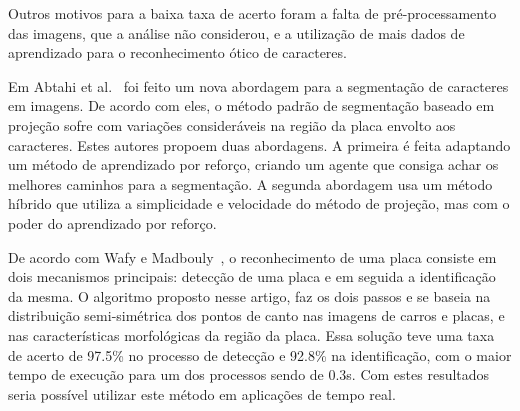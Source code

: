 Outros motivos para a baixa taxa de acerto foram a falta de pré-processamento
das imagens, que a análise não considerou, e a utilização de mais dados de
aprendizado para o reconhecimento ótico de caracteres.

Em Abtahi et al.~\cite{abtahi2015deep} foi feito um nova abordagem para a segmentação de
caracteres em imagens. De acordo com eles, o método padrão de segmentação
baseado em projeção sofre com variações consideráveis na região da placa envolto
aos caracteres. Estes autores propoem duas abordagens. A primeira é feita adaptando um método de
aprendizado por reforço, criando um agente que consiga achar os melhores caminhos para a segmentação. 
A segunda abordagem usa um método híbrido que utiliza a simplicidade e velocidade do método de projeção, 
mas com o poder do aprendizado por reforço.

De acordo com Wafy e Madbouly~\cite{wafy2016efficient}, o reconhecimento de uma placa consiste
em dois mecanismos principais: detecção de uma placa e em seguida a
identificação da mesma. O algoritmo proposto nesse artigo, faz os dois passos e
se baseia na distribuição semi-simétrica dos pontos de canto nas imagens de
carros e placas, e nas características morfológicas da região da placa. Essa
solução teve uma taxa de acerto de 97.5\% no processo de detecção e 92.8\% na
identificação, com o maior tempo de execução para um dos processos sendo de
0.3s. Com estes resultados seria possível utilizar este método em aplicações de tempo real.
